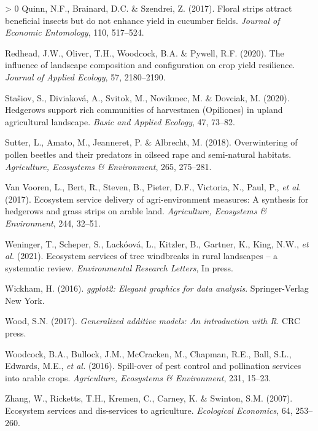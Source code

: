 \documentclass[]{elsarticle} %
\newlength{\cslhangindent}
\newenvironment{CSLReferences}[3] %
 {%
  \setlength{\parindent}{0pt}
  \ifodd #1 \everypar{\setlength{\hangindent}{\cslhangindent}}\ignorespaces\fi
  \ifnum #2 > 0
  \setlength{\parskip}{#2\baselineskip}
  \fi
 }%
 {}
\begin{document}
\begin{CSLReferences}{1}{0}
\leavevmode\hypertarget{ref-quinn2017}{}%
Quinn, N.F., Brainard, D.C. \& Szendrei, Z. (2017). Floral strips attract beneficial insects but do not enhance yield in cucumber fields. \emph{Journal of Economic Entomology}, 110, 517--524.

\leavevmode\hypertarget{ref-redhead2020}{}%
Redhead, J.W., Oliver, T.H., Woodcock, B.A. \& Pywell, R.F. (2020). The influence of landscape composition and configuration on crop yield resilience. \emph{Journal of Applied Ecology}, 57, 2180--2190.

\leavevmode\hypertarget{ref-stasiov2020}{}%
Stašiov, S., Diviaková, A., Svitok, M., Novikmec, M. \& Dovciak, M. (2020). Hedgerows support rich communities of harvestmen ({Opiliones}) in upland agricultural landscape. \emph{Basic and Applied Ecology}, 47, 73--82.

\leavevmode\hypertarget{ref-sutter2018b}{}%
Sutter, L., Amato, M., Jeanneret, P. \& Albrecht, M. (2018). Overwintering of pollen beetles and their predators in oilseed rape and semi-natural habitats. \emph{Agriculture, Ecosystems {\&} Environment}, 265, 275--281.

\leavevmode\hypertarget{ref-vanVooren2017}{}%
Van Vooren, L., Bert, R., Steven, B., Pieter, D.F., Victoria, N., Paul, P., \emph{et al.} (2017). Ecosystem service delivery of agri-environment measures: A synthesis for hedgerows and grass strips on arable land. \emph{Agriculture, Ecosystems {\&} Environment}, 244, 32--51.

\leavevmode\hypertarget{ref-weninger2021}{}%
Weninger, T., Scheper, S., Lackóová, L., Kitzler, B., Gartner, K., King, N.W., \emph{et al.} (2021). Ecosystem services of tree windbreaks in rural landscapes -- a systematic review. \emph{Environmental Research Letters}, In press.

\leavevmode\hypertarget{ref-wickham2016}{}%
Wickham, H. (2016). \emph{{ggplot2}: Elegant graphics for data analysis}. Springer-Verlag New York.

\leavevmode\hypertarget{ref-wood2017}{}%
Wood, S.N. (2017). \emph{Generalized additive models: An introduction with {R}}. CRC press.

\leavevmode\hypertarget{ref-woodcock2016}{}%
Woodcock, B.A., Bullock, J.M., McCracken, M., Chapman, R.E., Ball, S.L., Edwards, M.E., \emph{et al.} (2016). Spill-over of pest control and pollination services into arable crops. \emph{Agriculture, Ecosystems \& Environment}, 231, 15--23.

\leavevmode\hypertarget{ref-zhang2007}{}%
Zhang, W., Ricketts, T.H., Kremen, C., Carney, K. \& Swinton, S.M. (2007). Ecosystem services and dis-services to agriculture. \emph{Ecological Economics}, 64, 253--260.

\end{CSLReferences}
\end{document}
